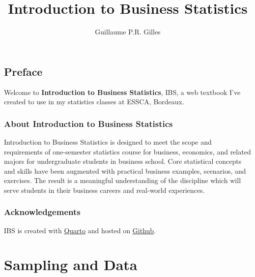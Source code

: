 \documentclass[
  letterpaper,
  DIV=11,
  numbers=noendperiod]{scrreprt}
\title{Introduction to Business Statistics}
\author{Guillaume P.R. Gilles}
\date{}
\renewcommand*\contentsname{Table of contents}
\newcommand\contentsname{Table of contents}
\begin{document}
\maketitle

\renewcommand*\contentsname{Table of contents}
{
\hypersetup{linkcolor=}
\setcounter{tocdepth}{2}
\tableofcontents
}

\chapter*{Preface}\label{preface}


Welcome to \textbf{Introduction to Business Statistics}, IBS, a web
textbook I've created to use in my statistics classes at ESSCA,
Bordeaux.

\section*{About Introduction to Business
Statistics}\label{about-introduction-to-business-statistics}


Introduction to Business Statistics is designed to meet the scope and
requirements of one-semester statistics course for business, economics,
and related majors for undergraduate students in business school. Core
statistical concepts and skills have been augmented with practical
business examples, scenarios, and exercises. The result is a meaningful
understanding of the discipline which will serve students in their
business careers and real-world experiences.

\section*{Acknowledgements}\label{acknowledgements}


IBS is created with \href{https://quarto.org/docs/books/}{Quarto} and
hosted on
\href{https://github.com/guillaumegilles/introduction-business-statistics}{Github}.

\part{Sampling and Data}
\end{document}
